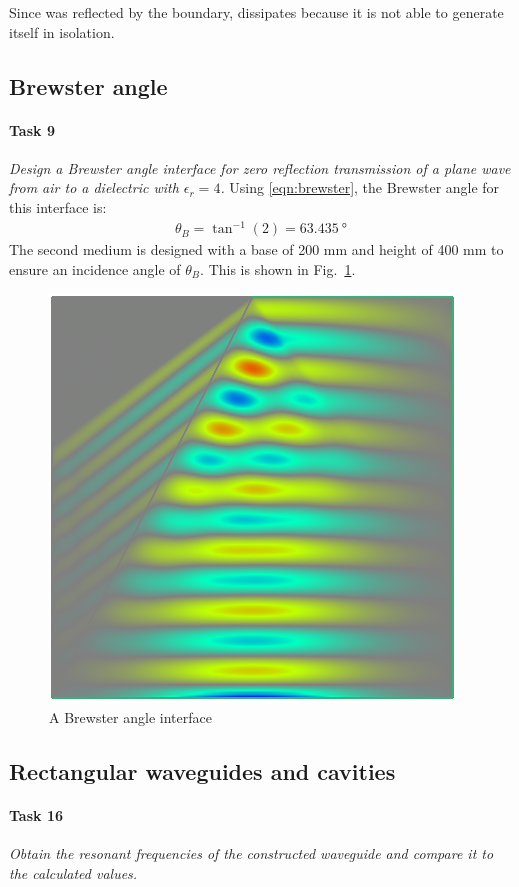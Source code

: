 Since  was reflected by the boundary,  dissipates because it is not able to generate itself in isolation.

\subsection{Brewster angle}
\paragraph{Task 9}\textit{Design a Brewster angle interface for zero reflection transmission of a plane wave from air to a dielectric with $\epsilon_r = 4$.}
Using \eqref{eqn:brewster}, the Brewster angle for this interface is:
\begin{align*}
	\theta_B = \tan^{-1}(2) = \SI{63.435}{\degree} 
\end{align*}
The second medium is designed with a base of 200 mm and height of 400 mm to ensure an incidence angle of $\theta_B$.
This is shown in Fig.~\ref{fig:Task9-Brewster}.

\begin{figure}[tbph]
	\centering
	\includegraphics[width=0.6\linewidth]{graphics/Task9-Brewster}
	\caption{A Brewster angle interface}
	\label{fig:Task9-Brewster}
\end{figure}


\pagebreak
\subsection{Rectangular waveguides and cavities}
\paragraph{Task 16}\textit{Obtain the resonant frequencies of the constructed waveguide and compare it to the calculated values.}

